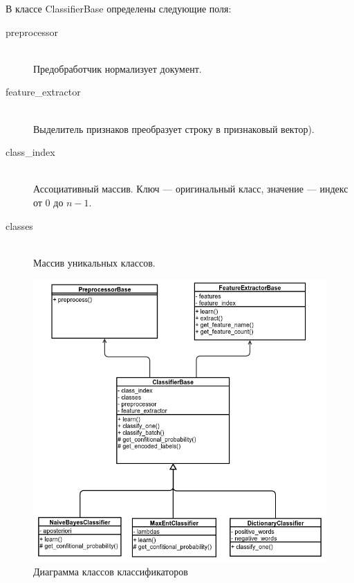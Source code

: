 В классе ClassifierBase определены следующие поля:
\begin{description}

\item[preprocessor] \hfill \\
Предобработчик нормализует документ. 

\item[feature\_extractor] \hfill \\
Выделитель признаков преобразует строку в признаковый вектор).

\item[class\_index] \hfill \\
Ассоциативный массив. Ключ --- оригинальный класс,
значение --- индекс от 0 до $n-1$.

\item[classes] \hfill \\
Массив уникальных классов.

\end{description}

\begin{figure}[!h]
\begin{center}
\includegraphics[scale=0.6, clip]{../resources/uml/classifiers_classes.png}
\caption{Диаграмма классов классификаторов}
\label{gr:classifiers}
\end{center}
\end{figure} 

